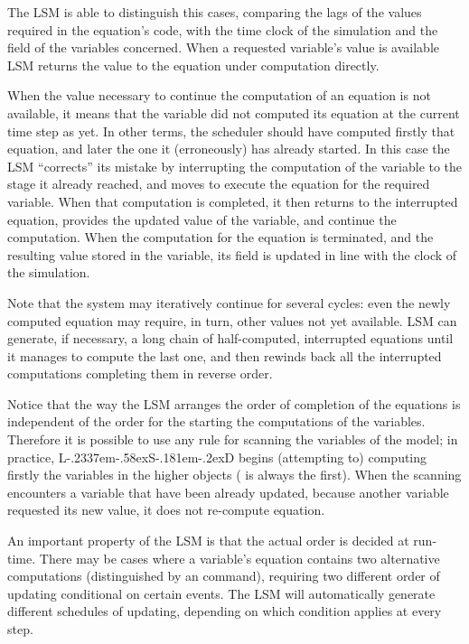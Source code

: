 \documentclass [11pt,a4paper] {book}
\def\LsD{{L\kern-.2337em\lower-.58ex\hbox{S}\kern-.181em\lower-.2ex\hbox{D}}\xspace}
\begin{document}
The LSM is able to distinguish this cases, comparing the lags of the values required in the equation's code, with the time clock of the simulation and the  field of the variables concerned. When a requested variable's value is available LSM returns the value to the equation under computation directly. 

When the value necessary to continue the computation of an equation is not available, it means that the variable did not computed its equation at the current time step as yet. In other terms, the scheduler should have computed firstly that equation, and later the one it (erroneously) has already started. In this case the LSM ``corrects'' its mistake by interrupting the computation of the variable to the stage it already reached, and moves to execute the equation for the required variable. When that computation is completed, it then returns to the interrupted equation, provides the updated value of the variable, and continue the computation. When the computation for the equation is terminated, and the resulting value stored in the variable, its field  is updated in line with the clock of the simulation.

Note that the system may iteratively continue for several cycles: even the newly computed equation may require, in turn, other values not yet available. LSM can generate, if necessary, a long chain of half-computed, interrupted equations until it manages to compute the last one, and then rewinds back all the interrupted computations completing them in reverse order.


Notice that the way the LSM arranges the order of completion of the equations is independent of the order for the starting the computations of the variables. Therefore it is possible to use any rule for scanning the variables of the model; in practice, \LsD begins (attempting to) computing firstly the variables in the higher objects ( is always the first). When the scanning encounters a variable that have been already updated, because another variable requested its new value, it does not re-compute equation.

An important property of the LSM is that the actual order is decided at run-time. There may be cases where a variable's equation contains two alternative computations (distinguished by an  command), requiring two different order of updating conditional on certain events. The LSM will automatically generate different schedules of updating, depending on which condition applies at every step.
\end{document}
